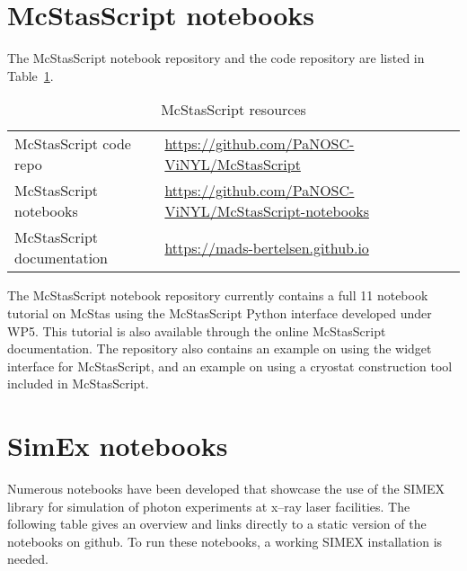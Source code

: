 \documentclass[10pt]{scrartcl}
\begin{document}
\section{McStasScript notebooks}
\label{sec:mcstas}
The McStasScript notebook repository and the code repository are listed
in Table~\ref{tab:mcstasscript_resources}.
\begin{table}[ht]
  \centering
  \caption{McStasScript resources}
  \begin{center}
    \begin{tabular}{ll}
      \hline
      McStasScript code repo  & \url{https://github.com/PaNOSC-ViNYL/McStasScript} \\ 
      McStasScript notebooks & \url{https://github.com/PaNOSC-ViNYL/McStasScript-notebooks} \\  
      McStasScript documentation & \url{https://mads-bertelsen.github.io}\\
      \hline
    \end{tabular}
  \end{center}
  \label{tab:mcstasscript_resources}
\end{table}
The McStasScript notebook repository currently contains a full 11 notebook
tutorial on McStas using the McStasScript Python interface developed under WP5.
This tutorial is also available through the online McStasScript documentation.
The repository also contains an example on using the widget interface for
McStasScript, and an example on using a cryostat construction tool included in
McStasScript.

\section{SimEx notebooks}
\label{sec:simex}
Numerous notebooks have been developed that showcase the use of the SIMEX
library for simulation of photon experiments at x--ray laser facilities. The
following table gives an overview and links directly to a static version of the
notebooks on github. 
To run these notebooks, a working SIMEX installation is needed.
\end{document}
